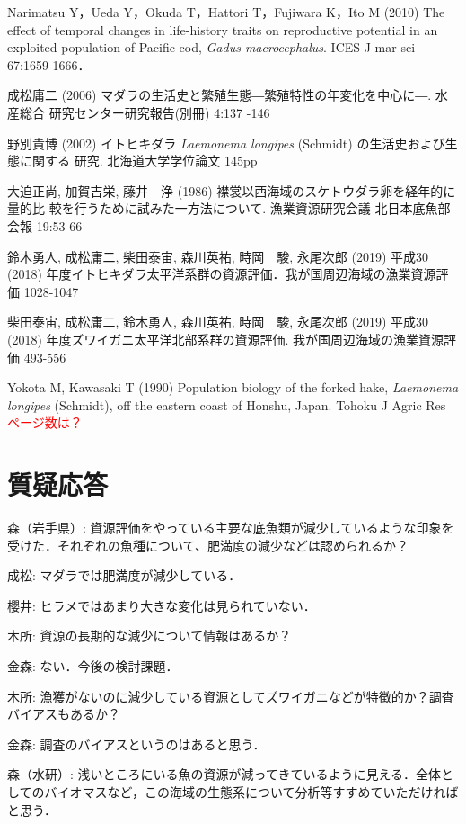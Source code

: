 \documentclass[11pt]{article} %
\begin{document}
\begin{linenumbers}
\hangindent=30pt
\noindent
Narimatsu Y，Ueda Y，Okuda T，Hattori T，Fujiwara K，Ito M (2010) The effect of temporal changes in life-history traits on reproductive potential in an exploited population of Pacific cod, \textit{Gadus macrocephalus}. ICES J mar sci 67:1659-1666．

\hangindent=30pt
\noindent
成松庸二 (2006) マダラの生活史と繁殖生態―繁殖特性の年変化を中心に―. 水産総合
研究センター研究報告(別冊) 4:137 -146

\hangindent=30pt
\noindent
野別貴博 (2002) イトヒキダラ \textit{Laemonema longipes} (Schmidt) の生活史および生態に関する
研究. 北海道大学学位論文 145pp

\hangindent=30pt
\noindent
大迫正尚, 加賀吉栄, 藤井　浄 (1986) 襟裳以西海域のスケトウダラ卵を経年的に量的比
較を行うために試みた一方法について. 漁業資源研究会議 北日本底魚部会報 19:53-66

\hangindent=30pt
\noindent
鈴木勇人, 成松庸二, 柴田泰宙, 森川英祐, 時岡　駿, 永尾次郎 (2019) 平成30 (2018) 年度イトヒキダラ太平洋系群の資源評価．我が国周辺海域の漁業資源評価 1028-1047

\hangindent=30pt
\noindent
柴田泰宙, 成松庸二, 鈴木勇人, 森川英祐, 時岡　駿, 永尾次郎 (2019) 平成30 (2018) 
年度ズワイガニ太平洋北部系群の資源評価. 我が国周辺海域の漁業資源評価 493-556

\hangindent=30pt
\noindent
Yokota M, Kawasaki T (1990) Population biology of the forked hake, \textit{Laemonema longipes} 
 (Schmidt), off the eastern coast of Honshu, Japan. Tohoku J Agric Res 
\textcolor{red}{ページ数は？}

\section{質疑応答}
森（岩手県）: 資源評価をやっている主要な底魚類が減少しているような印象を受けた．それぞれの魚種について、肥満度の減少などは認められるか？

成松: マダラでは肥満度が減少している．

櫻井: ヒラメではあまり大きな変化は見られていない．

木所: 資源の長期的な減少について情報はあるか？  

金森: ない．今後の検討課題．

木所: 漁獲がないのに減少している資源としてズワイガニなどが特徴的か？調査バイアスもあるか？

金森: 調査のバイアスというのはあると思う．

森（水研）: 浅いところにいる魚の資源が減ってきているように見える．全体としてのバイオマスなど，この海域の生態系について分析等すすめていただければと思う．


\end{linenumbers}
\end{document}
